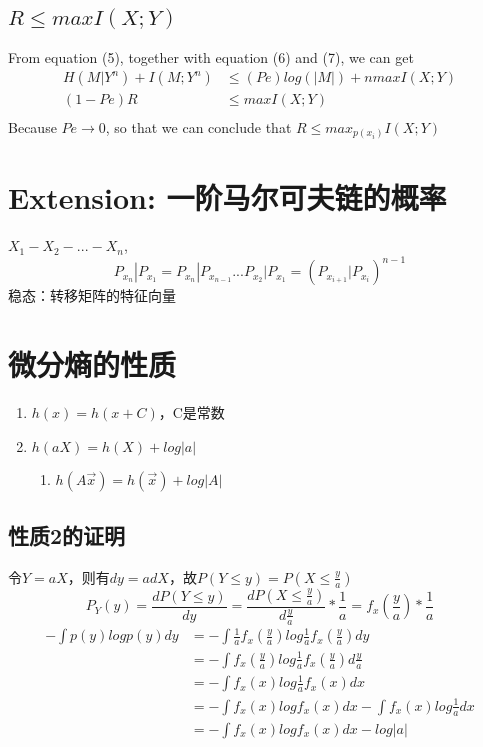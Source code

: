 \documentclass[a4paper, 12pt]{article}
\begin{document}
    \subsection{$R\le maxI(X;Y)$}
    From equation (5), together with equation (6) and (7), we can get
    \begin{equation}
        \begin{aligned}
            H(M|Y^n) + I(M;Y^n) &\le (Pe)log(|M|) + nmaxI(X;Y)\\
            (1-Pe)R &\le maxI(X;Y)\\
        \end{aligned}
    \end{equation}
    Because $Pe \rightarrow 0$, so that we can conclude that $R\le max_{p(x_i)}I(X;Y)$
    \section{Extension: 一阶马尔可夫链的概率}
    $X_1-X_2-...-X_n$, 
    \[
        P_{x_n}|P_{x_1}=P_{x_n}|P_{x_{n-1}}...P_{x_2}|P_{x_1}=(P_{x_{i+1}}|P_{x_{i}})^{n-1}  
    \]
    稳态：转移矩阵的特征向量
    \section{微分熵的性质}
    \begin{enumerate}
        \item $h(x)=h(x+C)$，C是常数
        \item $h(aX)=h(X)+log|a|$
        \begin{enumerate}
            \item $h(A\vec{x})=h(\vec{x})+log|A|$
        \end{enumerate}
    \end{enumerate}
    \subsection{性质2的证明}
    令$Y=aX$，则有$dy=adX$，故$P(Y\le y)=P(X\le \frac{y}{a})$
    \[
        P_Y(y)=\frac{dP(Y\le y)}{dy}=\frac{dP(X\le \frac{y}{a})}{d\frac{y}{a}}*\frac{1}{a}=f_x(\frac{y}{a})*\frac{1}{a}    
    \]
    \begin{equation}
        \begin{aligned}
            -\int p(y)logp(y)dy&=-\int \frac{1}{a}f_x(\frac{y}{a})log\frac{1}{a}f_x(\frac{y}{a})dy\\
            &=-\int f_x(\frac{y}{a})log\frac{1}{a}f_x(\frac{y}{a})d\frac{y}{a}\\
            &=-\int f_x(x)log\frac{1}{a}f_x(x)dx\\
            &=-\int f_x(x)log f_x(x)dx-\int f_x(x)log\frac{1}{a}dx\\
            &=-\int f_x(x)log f_x(x)dx-log|a|
        \end{aligned}
    \end{equation}
\end{document}
